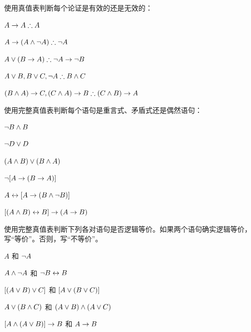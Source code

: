 \solutions
\problempart
\label{pr.TT.valid}
使用真值表判断每个论证是有效的还是无效的：


\begin{compactlist}
\item $A\eif A \therefore A$ %
\item $A\eif(A\eand\enot A) \therefore \enot A$ %
\item $A\eor(B\eif A) \therefore \enot A \eif \enot B$ %
\item $A\eor B, B\eor C, \enot A \therefore B \eand C$ %
\item $(B\eand A)\eif C, (C\eand A)\eif B \therefore (C\eand B)\eif A$ %
\end{compactlist}

\problempart 使用完整真值表判断每个语句是重言式、矛盾式还是偶然语句：


\begin{compactlist}
\item $\neg B \wedge B$ \vspace{.5ex}%


\item $\neg D \vee D$ \vspace{.5ex}%


\item $(A\wedge B) \vee (B\wedge A)$\vspace{.5ex} %


\item $\neg[A \rightarrow (B \rightarrow A)]$\vspace{.5ex} %


\item $A \leftrightarrow [A \rightarrow (B \wedge \neg B)]$ \vspace{.5ex}%


\item $[(A \wedge B) \leftrightarrow B] \rightarrow (A \rightarrow B)$ \vspace{.5ex}%

\end{compactlist}

\noindent\problempart
\label{pr.TT.equiv}
使用完整真值表判断下列各对语句是否逻辑等价。如果两个语句确实逻辑等价，写“等价”。否则，写“不等价”。


\begin{compactlist}
\item $A$ 和 $\neg A$
\item $A \wedge \neg A$ 和 $\neg B \leftrightarrow B$
\item $[(A \vee B) \vee C]$ 和 $[A \vee (B \vee C)]$
\item $A \vee (B \wedge C)$ 和 $(A \vee B) \wedge (A \vee C)$
\item $[A \wedge (A \vee B)] \rightarrow B$ 和 $A \rightarrow B$\end{compactlist}

